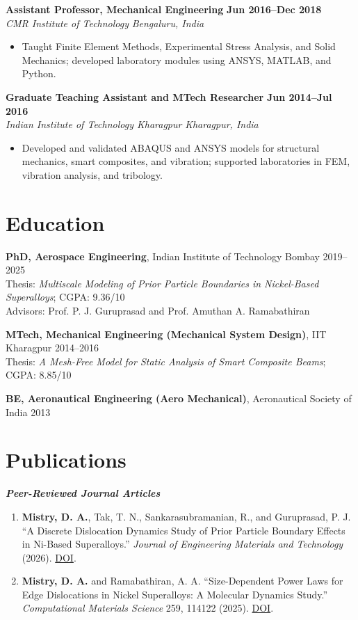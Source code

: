 \documentclass[10pt,a4paper]{article}
\newcommand{\role}[4]{%
  \textbf{#1} \hfill \textbf{#2}\\[-1pt]
  \textit{#3} \hfill \textit{#4}\vspace{1pt}
}
\begin{document}
\role{Assistant Professor, Mechanical Engineering}{Jun 2016--Dec 2018}{CMR Institute of Technology}{Bengaluru, India}
\begin{itemize}
  \item Taught Finite Element Methods, Experimental Stress Analysis, and Solid Mechanics; developed laboratory modules using ANSYS, MATLAB, and Python.
\end{itemize}

\role{Graduate Teaching Assistant and MTech Researcher}{Jun 2014--Jul 2016}{Indian Institute of Technology Kharagpur}{Kharagpur, India}
\begin{itemize}
  \item Developed and validated ABAQUS and ANSYS models for structural mechanics, smart composites, and vibration; supported laboratories in FEM, vibration analysis, and tribology.
\end{itemize}

\section{Education}
\textbf{PhD, Aerospace Engineering}, Indian Institute of Technology Bombay \hfill 2019--2025\\
Thesis: \textit{Multiscale Modeling of Prior Particle Boundaries in Nickel-Based Superalloys}; CGPA: 9.36/10\\
Advisors: Prof. P. J. Guruprasad and Prof. Amuthan A. Ramabathiran

\vspace{3pt}
\textbf{MTech, Mechanical Engineering (Mechanical System Design)}, IIT Kharagpur \hfill 2014--2016\\
Thesis: \textit{A Mesh-Free Model for Static Analysis of Smart Composite Beams}; CGPA: 8.85/10

\vspace{3pt}
\textbf{BE, Aeronautical Engineering (Aero Mechanical)}, Aeronautical Society of India \hfill 2013

\section{Publications}
\textbf{\textit{Peer-Reviewed Journal Articles}}
\begin{enumerate}[leftmargin=1.35em,itemsep=2pt,topsep=1pt]
  \item \textbf{Mistry, D. A.}, Tak, T. N., Sankarasubramanian, R., and Guruprasad, P. J. ``A Discrete Dislocation Dynamics Study of Prior Particle Boundary Effects in Ni-Based Superalloys.'' \textit{Journal of Engineering Materials and Technology} (2026). \href{https://doi.org/10.1115/1.4072448}{DOI}.
  \item \textbf{Mistry, D. A.} and Ramabathiran, A. A. ``Size-Dependent Power Laws for Edge Dislocations in Nickel Superalloys: A Molecular Dynamics Study.'' \textit{Computational Materials Science} 259, 114122 (2025). \href{https://doi.org/10.1016/j.commatsci.2025.114122}{DOI}.
\end{enumerate}
\end{document}
